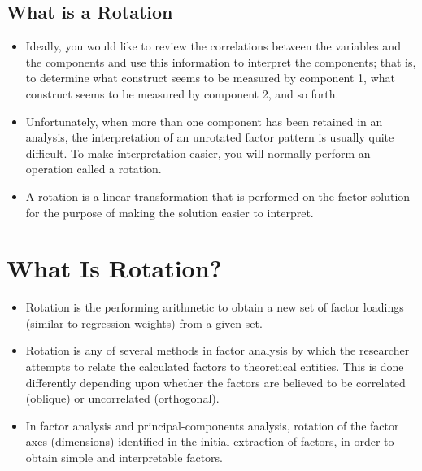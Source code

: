 \documentclass[a4paper,12pt]{article}
\begin{document}
\subsection{What is a Rotation}

\begin{itemize}
	\item Ideally, you would like to review the correlations between the variables and the
	components and use this information to interpret the components; that is, to determine what
	construct seems to be measured by component 1, what construct seems to be measured by
	component 2, and so forth.
	\item  Unfortunately, when more than one component has been retained in
	an analysis, the interpretation of an unrotated factor pattern is usually quite difficult. To make
	interpretation easier, you will normally perform an operation called a rotation. 
	\item A rotation is a
	linear transformation that is performed on the factor solution for the purpose of making the
	solution easier to interpret.
\end{itemize}


\section{What Is Rotation?}
\begin{itemize}
	\item Rotation is the performing arithmetic to obtain a new set of factor loadings (similar to regression weights) from a given set.
	
	\item Rotation is any of several methods in factor analysis by which the researcher attempts to relate the calculated factors to theoretical entities. This is done differently depending upon whether the factors are believed to be correlated (oblique) or uncorrelated
	(orthogonal). 
	\item In factor analysis and principal-components analysis, rotation of the factor axes
	(dimensions) identified in the initial extraction of factors, in order to obtain simple and interpretable
	factors.
\end{itemize}
\end{document}
